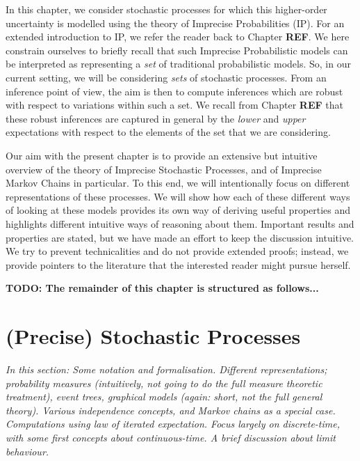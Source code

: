 \documentclass[graybox]{svmult}
\begin{document}
In this chapter, we consider stochastic processes for which this higher-order uncertainty is modelled using the theory of Imprecise Probabilities (IP). For an extended introduction to IP, we refer the reader back to Chapter {\bf REF}. We here constrain ourselves to briefly recall that such Imprecise Probabilistic models can be interpreted as representing a \emph{set} of traditional probabilistic models. So, in our current setting, we will be considering \emph{sets} of stochastic processes. From an inference point of view, the aim is then to compute inferences which are robust with respect to variations within such a set. We recall from Chapter {\bf REF} that these robust inferences are captured in general by the \emph{lower} and \emph{upper} expectations with respect to the elements of the set that we are considering.

Our aim with the present chapter is to provide an extensive but intuitive overview of the theory of Imprecise Stochastic Processes, and of Imprecise Markov Chains in particular. To this end, we will intentionally focus on different representations of these processes. We will show how each of these different ways of looking at these models provides its own way of deriving useful properties and highlights different intuitive ways of reasoning about them. Important results and properties are stated, but we have made an effort to keep the discussion intuitive. We try to prevent technicalities and do not provide extended proofs; instead, we provide pointers to the literature that the interested reader might pursue herself.

{\bf TODO: The remainder of this chapter is structured as follows...}

\section{(Precise) Stochastic Processes}

\emph{In this section: Some notation and formalisation. Different representations; probability measures (intuitively, not going to do the full measure theoretic treatment), event trees, graphical models (again: short, not the full general theory). Various independence concepts, and Markov chains as a special case. Computations using law of iterated expectation. Focus largely on discrete-time, with some first concepts about continuous-time. A brief discussion about limit behaviour.}
\end{document}
